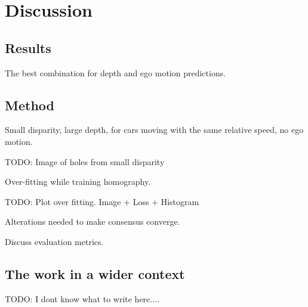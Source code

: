 \chapter{Discussion}\label{cha:discussion}

\section{Results}
The best combination for depth and ego motion predictions.

\section{Method}

Small disparity, large depth, for cars moving with the same relative speed, no ego motion.

TODO: Image of holes from small disparity

Over-fitting while training homography.

TODO: Plot over fitting. Image + Loss + Histogram

Alterations needed to make consensus converge.

Discuss evaluation metrics.

\section{The work in a wider context}

TODO: I dont know what to write here....